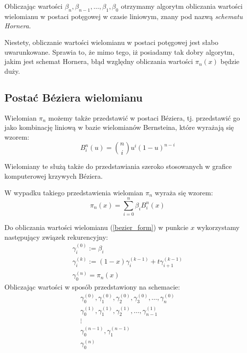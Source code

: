 \documentclass[wide, 11pt]{mwart}
\begin{document}
Obliczając wartości $\beta_n, \beta_{n-1}, \ldots, \beta_1, \beta_0$ otrzymamy
algorytm obliczania wartości wielomianu w postaci potęgowej w czasie liniowym,
znany pod nazwą \emph{schematu Hornera}.

Niestety, obliczanie wartości wielomianu w postaci potęgowej jest 
słabo uwarunkowane. Sprawia to, że mimo tego, iż posiadamy tak dobry algorytm,
jakim jest schemat Hornera, błąd względny obliczania wartości $\pi_n(x)$ będzie 
duży.

\subsection{Postać Béziera wielomianu}

Wielomian $\pi_n$ możemy także przedstawić w postaci Béziera, tj. przedstawić
go jako kombinację liniową w bazie wielomianów Bernsteina, które wyrażają się
wzorem:
\begin{equation}
  B^n_i(u) = {n \choose i}u^i(1-u)^{n-i}
\end{equation}

Wielomiany te służą także do przedstawiania szeroko stosowanych w grafice
komputerowej krzywych Béziera.

W wypadku takiego przedstawienia wielomian $\pi_n$ wyraża się wzorem:
\begin{equation}
  \label{bezier_form}
  \pi_n(x) = \sum_{i=0}^n\beta_iB^n_i(x)
\end{equation}

Do obliczania wartości wielomianu (\ref{bezier_form}) w punkcie $x$ wykorzystamy
następujący związek rekurencyjny:
\begin{subequations}
  \begin{align}
    \gamma_i^{(0)} := \beta_i\\
    \gamma_i^{(k)} := (1-x)\gamma_i^{(k-1)} + t\gamma_{i+1}^{(k-1)}\\
    \gamma_0^{(n)} = \pi_n(x)
  \end{align}
\end{subequations}
Obliczając wartości w sposób przedstawiony na schemacie:
\begin{subequations}
  \begin{gather}
    \gamma_0^{(0)}, \gamma_1^{(0)}, \gamma_2^{(0)}, \gamma_3^{(0)}, \ldots, \gamma_n^{(0)}\\
    \gamma_0^{(1)}, \gamma_1^{(1)}, \gamma_2^{(1)}, \ldots, \gamma_{n-1}^{(1)}\\
    \vdots \\
    \gamma_0^{(n-1)}, \gamma_1^{(n-1)}\\
    \gamma_0^{(n)}
  \end{gather}
\end{subequations}
\end{document}
